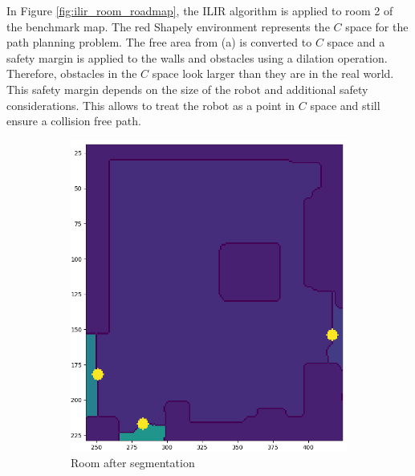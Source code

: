 In Figure \ref{fig:ilir_room_roadmap}, the ILIR algorithm is applied to room 2 of the benchmark map. The red Shapely environment represents the \(C\) space for the path planning problem. The free area from (a) is converted to \(C\) space and a safety margin is applied to the walls and obstacles using a dilation operation.  Therefore, obstacles in the \(C\) space look larger than they are in the real world. This safety margin depends on the size of the robot and additional safety considerations. This allows to treat the robot as a point in \(C\) space and still ensure a collision free path. 
\begin{figure}[h]
    \captionsetup[subfigure]{justification=centering}
    \centering
    \begin{subfigure}{.235\textwidth}
      \centering
      \includegraphics[width=\textwidth]{figures/50_implementation/ryu_room2_clean.png}
      \caption{Room after segmentation}
    \end{subfigure}%
    \begin{subfigure}{.25\textwidth}
      \centering

\end{subfigure}
\end{figure}
